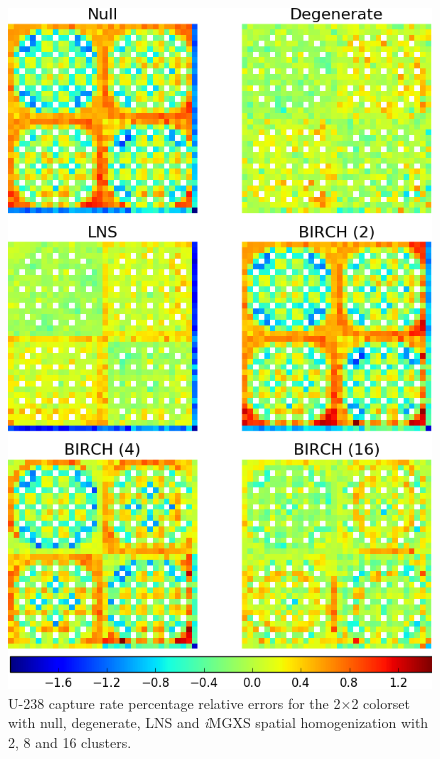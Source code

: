 \documentclass[12pt,twoside]{mitthesis-exec}
\begin{document}
\begin{figure}[h!]
\centering
\includegraphics[width=0.83\linewidth]{figures/results/spatial/reflector/capt-err}
\vspace{2mm}
\caption[U-238 capture rate errors for the 2$\times$2 colorset]{U-238 capture rate percentage relative errors for the 2$\times$2 colorset with null, degenerate, LNS and \textit{i}MGXS spatial homogenization with 2, 8 and 16 clusters.}
\label{fig:refl-capt-err}
\end{figure}

\clearpage
\end{document}
